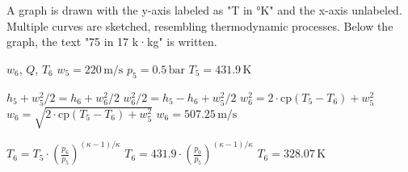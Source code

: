 A graph is drawn with the y-axis labeled as "T in °K" and the x-axis unlabeled. Multiple curves are sketched, resembling thermodynamic processes. Below the graph, the text "75 in 17 k·kg" is written.

\( w_6 \), \( Q \), \( T_6 \)  
\( w_5 = 220 \, \text{m/s} \)  
\( p_5 = 0.5 \, \text{bar} \)  
\( T_5 = 431.9 \, \text{K} \)  

\( h_5 + w_5^2 / 2 = h_6 + w_6^2 / 2 \)  
\( w_6^2 / 2 = h_5 - h_6 + w_5^2 / 2 \)  
\( w_6^2 = 2 \cdot \text{cp} (T_5 - T_6) + w_5^2 \)  
\( w_6 = \sqrt{2 \cdot \text{cp} (T_5 - T_6) + w_5^2} \)  
\( w_6 = 507.25 \, \text{m/s} \)  

\( T_6 = T_5 \cdot \left( \frac{p_6}{p_5} \right)^{(\kappa - 1) / \kappa} \)  
\( T_6 = 431.9 \cdot \left( \frac{p_0}{p_5} \right)^{(\kappa - 1) / \kappa} \)  
\( T_6 = 328.07 \, \text{K} \)